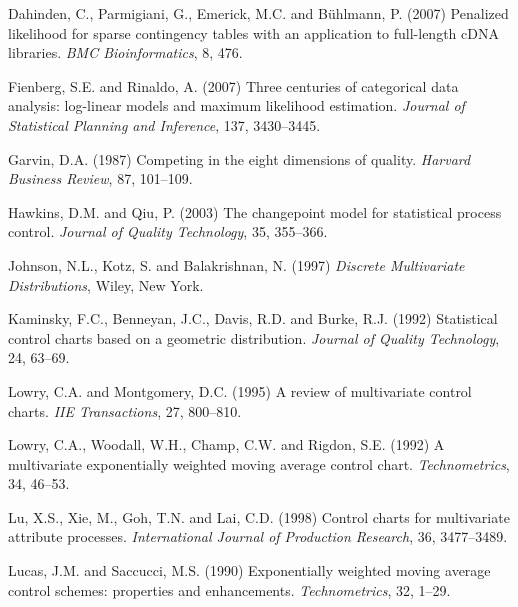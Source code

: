 \begin{thebibliography}{}
\item Dahinden, C., Parmigiani, G., Emerick, M.C. and B\"uhlmann, P.
(2007) Penalized likelihood for sparse contingency tables with an application to
full-length cDNA libraries. {\it BMC Bioinformatics}, 8, 476.

\item Fienberg, S.E. and Rinaldo, A. (2007) Three centuries of categorical data analysis:
log-linear models and maximum likelihood estimation. {\it Journal of Statistical
Planning and Inference}, 137, 3430--3445.

\item Garvin, D.A. (1987) Competing in the eight dimensions of quality. {\it Harvard Business
Review}, 87, 101--109.

\item Hawkins, D.M. and Qiu, P. (2003) The changepoint model for statistical process
control. {\it Journal of Quality Technology}, 35, 355--366.


\item Johnson, N.L., Kotz, S. and Balakrishnan, N. (1997) {\it Discrete Multivariate
Distributions}, Wiley, New York.

\item Kaminsky, F.C., Benneyan, J.C., Davis, R.D. and Burke, R.J.
(1992) Statistical control charts based on a geometric distribution. {\it Journal of
Quality Technology}, 24, 63--69.

\item Lowry, C.A. and Montgomery, D.C. (1995) A review of multivariate control charts.
{\it IIE Transactions}, 27, 800--810.

\item Lowry, C.A., Woodall, W.H., Champ, C.W. and Rigdon, S.E. (1992) A multivariate exponentially
weighted moving average control chart. {\it Technometrics}, 34, 46--53.

\item Lu, X.S., Xie, M., Goh, T.N. and Lai, C.D. (1998) Control charts
for multivariate attribute processes. {\it International Journal of Production
Research}, 36, 3477--3489.

\item Lucas, J.M. and Saccucci, M.S. (1990) Exponentially
weighted moving average control schemes: properties and enhancements. {\it
Technometrics}, 32, 1--29.


\end{thebibliography}
